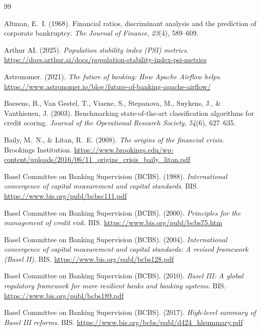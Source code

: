 \documentclass[12pt,a4paper]{report}
\begin{document}
\begin{thebibliography}{99}

Altman, E.~I. (1968). Financial ratios, discriminant analysis and the prediction of corporate bankruptcy. \textit{The Journal of Finance}, \textit{23}(4), 589--609.

Arthur AI. (2025). \textit{Population stability index (PSI) metrics}. \url{https://docs.arthur.ai/docs/population-stability-index-psi-metrics}

Astronomer. (2021). \textit{The future of banking: How Apache Airflow helps}. \url{https://www.astronomer.io/blog/future-of-banking-apache-airflow/}

Baesens, B., Van Gestel, T., Viaene, S., Stepanova, M., Suykens, J., \& Vanthienen, J. (2003). Benchmarking state-of-the-art classification algorithms for credit scoring. \textit{Journal of the Operational Research Society}, \textit{54}(6), 627--635.

Baily, M.~N., \& Litan, R.~E. (2008). \textit{The origins of the financial crisis}. Brookings Institution. \url{https://www.brookings.edu/wp-content/uploads/2016/06/11_origins_crisis_baily_litan.pdf}

Basel Committee on Banking Supervision (BCBS). (1988). \textit{International convergence of capital measurement and capital standards}. BIS. \url{https://www.bis.org/publ/bcbsc111.pdf}

Basel Committee on Banking Supervision (BCBS). (2000). \textit{Principles for the management of credit risk}. BIS. \url{https://www.bis.org/publ/bcbs75.htm}

Basel Committee on Banking Supervision (BCBS). (2004). \textit{International convergence of capital measurement and capital standards: A revised framework (Basel II)}. BIS. \url{https://www.bis.org/publ/bcbs128.pdf}

Basel Committee on Banking Supervision (BCBS). (2010). \textit{Basel III: A global regulatory framework for more resilient banks and banking systems}. BIS. \url{https://www.bis.org/publ/bcbs189.pdf}

Basel Committee on Banking Supervision (BCBS). (2017). \textit{High-level summary of Basel III reforms}. BIS. \url{https://www.bis.org/bcbs/publ/d424_hlsummary.pdf}


\end{thebibliography}
\end{document}
